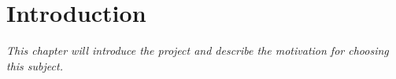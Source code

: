 \chapter{Introduction}
\label{cha:introduction}

\textit{This chapter will introduce the project and describe the motivation for choosing this subject.}\newpage

%

